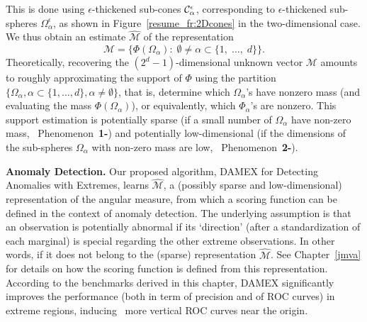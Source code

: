 This is done using $\epsilon$-thickened sub-cones $\mathcal{C}_\alpha^\epsilon$, corresponding to $\epsilon$-thickened sub-spheres $\Omega_\alpha^\epsilon$, as shown in Figure~\ref{resume_fr:2Dcones} in the two-dimensional case.
We thus obtain an estimate $\widehat{\mathcal{M}}$ of the representation
$$\mathcal{M} = \{ \Phi(\Omega_{\alpha}):\; \emptyset \neq \alpha\subset\{1,\; \ldots,\; d \}\}.$$
Theoretically, recovering the $(2^{d}-1)$-dimensional unknown
vector $\mathcal{M}$ amounts to roughly approximating the support of $\Phi$ using the partition
$\{\Omega_\alpha, \alpha\subset\{1,\ldots,d\}, \alpha\neq \emptyset\}$, that is, determine which $\Omega_\alpha$'s have
nonzero mass (and evaluating the mass $\Phi(\Omega_\alpha)$), or equivalently, which $\Phi_\alpha$'s are nonzero. This support estimation is potentially
sparse (if a small number of $\Omega_\alpha$ have non-zero mass, \ie~Phenomenon~\textbf{1-}) and
potentially low-dimensional (if the dimensions of the sub-spheres $\Omega_\alpha$ with non-zero mass are low, \ie~Phenomenon~\textbf{2-}).



\textbf{Anomaly Detection.}
Our proposed algorithm, DAMEX for Detecting Anomalies with Extremes, learns $\widehat{\mathcal{M}}$, a (possibly sparse and low-dimensional) representation of the angular measure, from which a scoring function can be defined in the context of anomaly detection.
The underlying assumption is that an observation is potentially abnormal if its `direction' (after a standardization of each marginal) is special regarding the other extreme observations. In other words, if it does not belong to the (sparse) representation $\widehat{\mathcal{M}}$. See Chapter~\ref{jmva} for details on how the scoring function is defined from this representation.
According to the benchmarks derived in this chapter, DAMEX significantly improves the performance (both in term of precision and of ROC curves) in extreme regions, inducing \eg~more vertical ROC curves near the origin.

